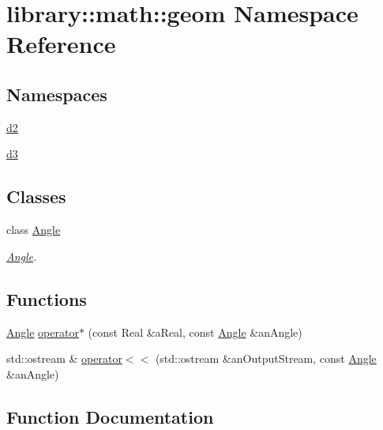\hypertarget{namespacelibrary_1_1math_1_1geom}{}\section{library\+:\+:math\+:\+:geom Namespace Reference}
\label{namespacelibrary_1_1math_1_1geom}
\subsection*{Namespaces}
\begin{DoxyCompactItemize}
\item 
 \hyperlink{namespacelibrary_1_1math_1_1geom_1_1d2}{d2}
\item 
 \hyperlink{namespacelibrary_1_1math_1_1geom_1_1d3}{d3}
\end{DoxyCompactItemize}
\subsection*{Classes}
\begin{DoxyCompactItemize}
\item 
class \hyperlink{classlibrary_1_1math_1_1geom_1_1_angle}{Angle}
\begin{DoxyCompactList}\small\item\em \hyperlink{classlibrary_1_1math_1_1geom_1_1_angle}{Angle}. \end{DoxyCompactList}\end{DoxyCompactItemize}
\subsection*{Functions}
\begin{DoxyCompactItemize}
\item 
\hyperlink{classlibrary_1_1math_1_1geom_1_1_angle}{Angle} \hyperlink{namespacelibrary_1_1math_1_1geom_a7f77c4f8d55dbd419a7a9b19aba9a00d}{operator$\ast$} (const Real \&a\+Real, const \hyperlink{classlibrary_1_1math_1_1geom_1_1_angle}{Angle} \&an\+Angle)
\item 
std\+::ostream \& \hyperlink{namespacelibrary_1_1math_1_1geom_adeb31e2f219ef8195271d7655dedd3b8}{operator$<$$<$} (std\+::ostream \&an\+Output\+Stream, const \hyperlink{classlibrary_1_1math_1_1geom_1_1_angle}{Angle} \&an\+Angle)
\end{DoxyCompactItemize}


\subsection{Function Documentation}
\mbox{\label{namespacelibrary_1_1math_1_1geom_a7f77c4f8d55dbd419a7a9b19aba9a00d}} 
